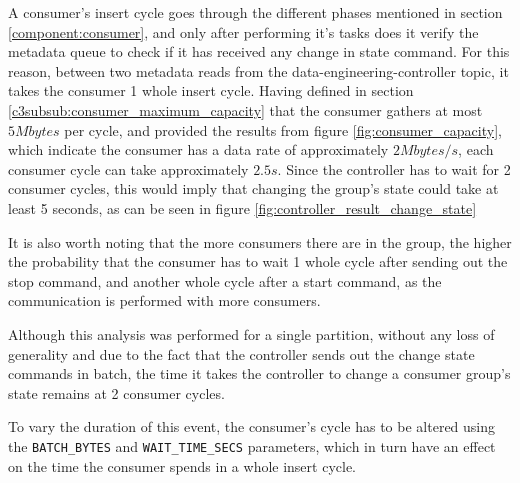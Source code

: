 A consumer's insert cycle goes through the different phases mentioned in section
\ref{component:consumer}, and only after performing it's tasks does it verify
the metadata queue to check if it has received any change in state command. For
this reason, between two metadata reads from the data-engineering-controller
topic, it takes the consumer 1 whole insert cycle. Having defined in section
\ref{c3subsub:consumer_maximum_capacity} that the consumer gathers at most
$5Mbytes$ per cycle, and provided the results from figure
\ref{fig:consumer_capacity}, which indicate the consumer has a data rate of
approximately $2Mbytes/s$, each consumer cycle can take approximately $2.5s$.
Since the controller has to wait for 2 consumer cycles, this would imply that
changing the group's state could take at least 5 seconds, as can be seen in figure
\ref{fig:controller_result_change_state}

It is also worth noting that the more consumers there are in the group, the
higher the probability that the consumer has to wait 1 whole cycle after sending
out the stop command, and another whole cycle after a start command, as the
communication is performed with more consumers.

Although this analysis was performed for a single partition, without any loss of
generality and due to the fact that the controller sends out the change state
commands in batch, the time it takes the controller to change a consumer group's
state remains at 2 consumer cycles.

To vary the duration of this event, the consumer's cycle has to be altered using
the \lstinline[language=Python]{BATCH_BYTES} and
\lstinline[language=Python]{WAIT_TIME_SECS} parameters, which in turn have an
effect on the time the consumer spends in a whole insert cycle.
